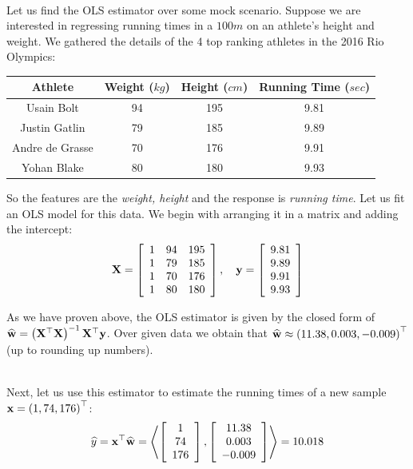 ~\\
\begin{example}
	Let us find the OLS estimator over some mock scenario. Suppose we are interested in regressing running times in a $100m$ on an athlete's height and weight. We gathered the details of the 4 top ranking athletes in the 2016 Rio Olympics:

	\begin{center}\begin{tabular}{|c|c|c|c|}
		\hline 
		Athlete & Weight ($kg$) & Height ($cm$) & Running Time ($sec$)\tabularnewline
		\hline 
		\hline 
		Usain Bolt & 94 & 195 & 9.81\tabularnewline
		\hline 
		Justin Gatlin & 79 & 185 & 9.89\tabularnewline
		\hline 
		Andre de Grasse & 70 & 176 & 9.91\tabularnewline
		\hline 
		Yohan Blake & 80 & 180 & 9.93\tabularnewline
		\hline 
	\end{tabular}\end{center}
	
	So the features are the \textit{weight, height} and the response is \textit{running time}. Let us fit an OLS model for this data. We begin with arranging it in a matrix and adding the intercept:
	$$
	\mathbf{X}=\left[\begin{array}{ccc}
	1 & 94 & 195\\
	1 & 79 & 185\\
	1 & 70 & 176\\
	1 & 80 & 180
	\end{array}\right],\quad \mathbf{y}=\left[\begin{array}{c} 9.81 \\ 9.89 \\ 9.91 \\ 9.93 \end{array}\right]
	$$
	
	As we have proven above, the OLS estimator is given by the closed form of $\widehat{\mathbf{w}}=\left(\mathbf{X}^\top\mathbf{X}\right)^{-1}\mathbf{X}^\top\mathbf{y}$. Over given data we obtain that $\widehat{\mathbf{w}}\approx\left(11.38, 0.003, -0.009\right)^\top$ (up to rounding up numbers).
	
	~\\Next, let us use this estimator to estimate the running times of a new sample $\mathbf{x}=\left(1, 74, 176\right)^\top$:
	$$ \widehat{y} = \mathbf{x}^\top\widehat{\mathbf{w}} = \left\langle \left[\begin{array}{c} 1\\ 74 	\\ 176	\\
	\end{array}\right],\left[\begin{array}{c} 11.38 \\ 0.003 \\ -0.009 \\ \end{array}\right]\right\rangle = 10.018 $$
\end{example}

